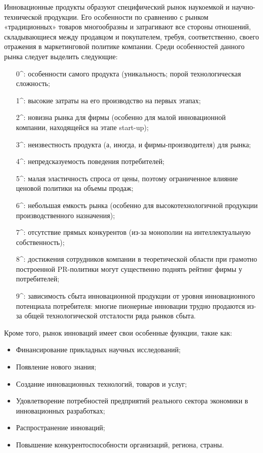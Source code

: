 \documentclass[11pt]{article}
\theoremstyle{plain} %
\theoremstyle{definition} %
\theoremstyle{remark} %
\begin{document}
Инновационные продукты образуют специфический рынок наукоемкой и научно-технической продукции. Его особенности по сравнению с рынком «традиционных» товаров многообразны и затрагивают все стороны отношений, складывающиеся между продавцом и покупателем, требуя, соответственно, своего отражения в маркетинговой политике компании. Среди особенностей данного рынка следует выделить следующие:
\begin{itemize}
	\item[0^{\circ}:] особенности самого продукта (уникальность; порой технологическая сложность;
	\item[1^{\circ}:] высокие затраты на его производство на первых этапах;
	\item[2^{\circ}:] новизна рынка для фирмы (особенно для малой инновационной компании, находящейся на этапе start-up);
	\item[3^{\circ}:] неизвестность продукта (а, иногда, и фирмы-производителя) для рынка;
	\item[4^{\circ}:] непредсказуемость поведения потребителей;
	\item[5^{\circ}:] малая эластичность спроса от цены, поэтому ограниченное влияние ценовой политики на объемы продаж;
	\item[6^{\circ}:] небольшая емкость рынка (особенно для высокотехнологичной продукции производственного назначения);
	\item[7^{\circ}:] отсутствие прямых конкурентов (из-за монополии на интеллектуальную собственность);
	\item[8^{\circ}:] достижения сотрудников компании в теоретической области при грамотно построенной PR-политики могут существенно поднять рейтинг фирмы у потребителей;
	\item[9^{\circ}:] зависимость сбыта инновационной продукции от уровня инновационного потенциала потребителя: многие пионерные инновации трудно продаются из-за общей технологической отсталости ряда рынков сбыта.
\end{itemize}

Кроме того, рынок инноваций имеет свои особенные функции, такие как:
\begin{itemize}
	\item Финансирование прикладных научных исследований;
	\item Появление нового знания;
	\item Создание инновационных технологий, товаров и услуг;
	\item Удовлетворение потребностей предприятий реального сектора экономики в инновационных разработках;
	\item Распространение инноваций;
	\item Повышение конкурентоспособности организаций, региона, страны.
\end{itemize}
\newpage
\end{document}
